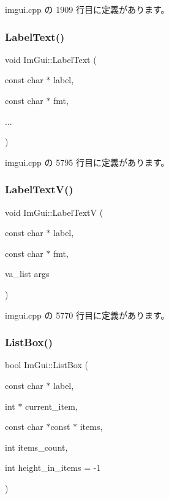  imgui.\+cpp の 1909 行目に定義があります。

\mbox{\label{namespace_im_gui_ad92ccfbc33d448ff40cfcf9219177344}} 
\subsubsection{\texorpdfstring{Label\+Text()}{LabelText()}}
{\footnotesize\ttfamily void Im\+Gui\+::\+Label\+Text (\begin{DoxyParamCaption}\item[{const char $\ast$}]{label,  }\item[{const char $\ast$}]{fmt,  }\item[{}]{... }\end{DoxyParamCaption})}



 imgui.\+cpp の 5795 行目に定義があります。

\mbox{\label{namespace_im_gui_a55e5a7edb676a8f5cd7f65443138a8a0}} 
\subsubsection{\texorpdfstring{Label\+Text\+V()}{LabelTextV()}}
{\footnotesize\ttfamily void Im\+Gui\+::\+Label\+TextV (\begin{DoxyParamCaption}\item[{const char $\ast$}]{label,  }\item[{const char $\ast$}]{fmt,  }\item[{va\+\_\+list}]{args }\end{DoxyParamCaption})}



 imgui.\+cpp の 5770 行目に定義があります。

\mbox{\label{namespace_im_gui_a93d68a6602e155134405ce17085501e9}} 
\subsubsection{\texorpdfstring{List\+Box()}{ListBox()}\hspace{0.1cm}{\footnotesize\ttfamily [1/2]}}
{\footnotesize\ttfamily bool Im\+Gui\+::\+List\+Box (\begin{DoxyParamCaption}\item[{const char $\ast$}]{label,  }\item[{int $\ast$}]{current\+\_\+item,  }\item[{const char $\ast$const $\ast$}]{items,  }\item[{int}]{items\+\_\+count,  }\item[{int}]{height\+\_\+in\+\_\+items = {\ttfamily -\/1} }\end{DoxyParamCaption})}



